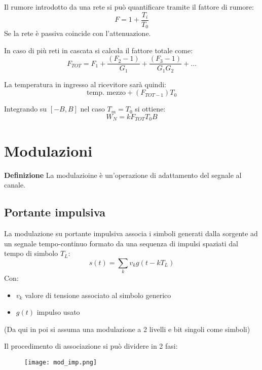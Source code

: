 \documentclass{article}
\newcommand{\df}{\noindent\textbf{Definizione} }
\begin{document}
\begin{itemize}
    Il rumore introdotto da una rete si può quantificare tramite il fattore di rumore:
    $$F=1+\frac{T_i}{T_0}$$
    \noindent Se la rete è passiva coincide con l'attenuazione.\newline

    In caso di più reti in cascata si calcola il fattore totale come:
    $$F_{TOT}=F_1+\frac{(F_2-1)}{G_1}+\frac{(F_3-1)}{G_1G_2}+\ldots$$\newline
    
    La temperatura in ingresso al ricevitore sarà quindi:
    $$\text{temp. mezzo}+(F_{TOT-1})T_0$$\newline

    Integrando su $[-B,B]$ nel caso $T_m=T_0$ si ottiene:
    $$W_N=kF_{TOT}T_0B$$
    
\end{itemize}

\section{Modulazioni}

\df La modulazioine è un'operazione di adattamento del segnale al canale.\newline

\subsection{Portante impulsiva}

La modulazione su portante impulsiva associa i simboli generati dalla sorgente ad un segnale tempo-continuo formato da una sequenza di impulsi spaziati dal tempo di simbolo $T_L$:
$$s(t)=\sum_kv_kg(t-kT_L)$$
\noindent Con:
\begin{itemize}
    \item $v_k$ valore di tensione associato al simbolo generico
    \item $g(t)$ impulso usato\newline
\end{itemize}

\noindent(Da qui in poi si assuma una modulazione a 2 livelli e bit singoli come simboli)\newline

\noindent Il procedimento di associazione si può dividere in 2 fasi:

\begin{figure}[ht]
    \centering
    \texttt{[image: mod\_imp.png]}
\end{figure}
\end{document}

